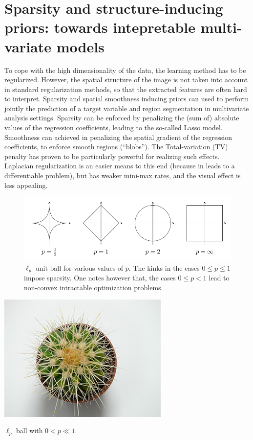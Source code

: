 \section{Sparsity and structure-inducing priors: towards intepretable multi-variate models}
To cope with the high dimensionality of the data, the learning method has to be
regularized. However, the spatial structure of the image is not
taken into account in standard regularization methods, so that the
extracted features are often hard to interpret.
Sparsity and spatial smoothness inducing priors can used to
perform jointly the prediction of a target variable and region
segmentation in multivariate analysis settings. Sparsity can be enforced by
penalizing the (sum of) absolute values of the regression coefficients, leading to the
so-called Lasso model. Smoothness can achieved in penalizing the spatial gradient of
the regression coefficients, to enforce smooth regions (``blobs'').
The Total-variation (TV)~\citep{rudin1992nonlinear} penalty has
proven to be particularly powerful for realizing such effects. Laplacian regularization
is an easier means to this end (because in leads to a differentiable problem),
but has weaker mini-max rates, and the visual effect is less appealing.

\begin{figure}[!htbp]
  \includegraphics[width=1\linewidth]{figures/balls.png}
  \caption{$\ell_p$ unit ball for various values of $p$. The kinks
    in the cases $0 \le p \le 1$ impose sparsity. One notes however that, the
  cases $0 \le p < 1$ lead to non-convex intractable optimization problems.}
\end{figure}

\begin{marginfigure}[4cm]
  \centering
  \includegraphics[width=1\linewidth]{figures/ball.jpg}
  \caption{$\ell_p$ ball with $0 < p \ll 1$.}
  \label{fig:flower}
\end{marginfigure}

